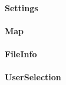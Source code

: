 \paragraph{Settings}
\label{para:settings}

\paragraph{Map}
\label{para:map}

\paragraph{FileInfo}
\label{para:file_info}

\paragraph{UserSelection}
\label{para:user_selection}

